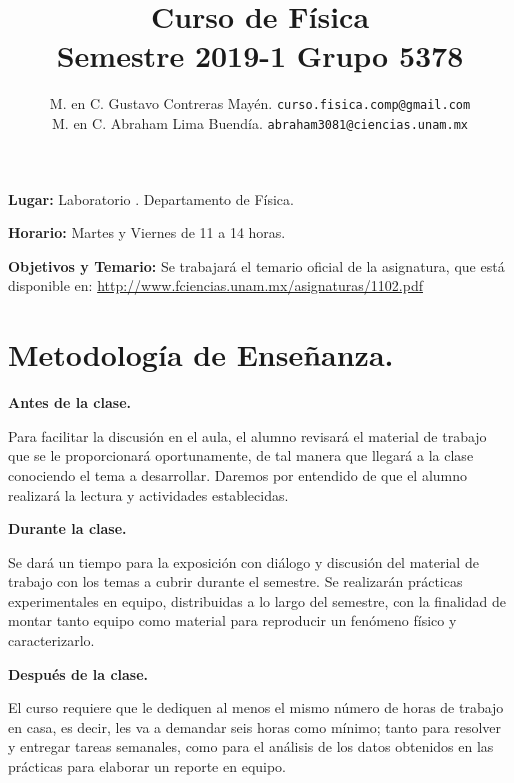 \documentclass[12pt]{article}
\author{M. en C. Gustavo Contreras Mayén. \texttt{curso.fisica.comp@gmail.com}\\
M. en C. Abraham Lima Buendía. \texttt{abraham3081@ciencias.unam.mx}}
\title{Curso de Física\\{\large Semestre 2019-1 Grupo 5378}}
\date{ }
\begin{document}
\renewcommand\labelenumii{\theenumi.{\arabic{enumii}}}
\maketitle
\fontsize{12}{12}\selectfont
\textbf{Lugar: }Laboratorio . Departamento de Física.

\textbf{Horario: } Martes y Viernes de 11 a 14 horas.

\textbf{Objetivos y Temario:} Se trabajará el temario oficial de la asignatura, que está disponible en: \href{http://www.fciencias.unam.mx/asignaturas/1102.pdf}{http://www.fciencias.unam.mx/asignaturas/1102.pdf}
\section{Metodología de Enseñanza.}
\textbf{Antes de la clase.} 

Para facilitar la discusión en el aula, el alumno revisará el material de trabajo que se le proporcionará oportunamente, de tal manera que llegará a la clase conociendo el tema a desarrollar. Daremos por entendido de que el alumno realizará la lectura y actividades establecidas.

\textbf{Durante la clase.}

Se dará un tiempo para la exposición con diálogo y discusión del material de trabajo con los temas a cubrir durante el semestre. Se realizarán prácticas experimentales en equipo, distribuidas a lo largo del semestre, con la finalidad de montar tanto equipo como material para reproducir un fenómeno físico y caracterizarlo.

\textbf{Después de la clase.}

El curso requiere que le dediquen al menos el mismo número de horas de trabajo en casa, es decir, les va a demandar seis horas como mínimo; tanto para resolver y entregar tareas semanales, como para el análisis de los datos obtenidos en las prácticas para elaborar un reporte en equipo.
\end{document}

